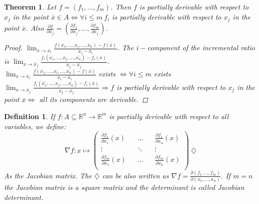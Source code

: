 \documentclass{article}
\newtheorem{theorem}{Theorem}
\newtheorem{definition}{Definition}
\begin{document}
            \begin{theorem}
                Let $f = (f_1,\dots,f_m)$. Then $f$ is partially derivable with respect to $x_j$ in the point $\overline{x} \in A \Longleftrightarrow \forall i \leq m \ f_i$ is partially derivable with respect to $x_j$ in the point $\overline{x}$. Also $\frac{\partial f}{\partial x_j} = \left( \frac{\partial f_1}{\partial x_j},\dots,\frac{\partial f_m}{\partial x_j}\right)$.
                \begin{proof}
                    $\lim_{x \to \overline{x_i}} \frac{f(\overline{x_1},\dots,x_i,\dots,\overline{x_n}) - f(\overline{x})}{x_i - \overline{x_i}}$. The $i-$component of the incremental ratio is $\lim_{x \to \overline{x_j}} \frac{f_i(\overline{x_1},\dots,x_j,\dots,\overline{x_n}) - f_i(\overline{x})}{x_j - \overline{x_j}}$. \\ 
                    $\lim_{x \to \overline{x_i}} \frac{f(\overline{x_1},\dots,x_i,\dots,\overline{x_n}) - f(\overline{x})}{x_i - \overline{x_i}}$ exists $\Longleftrightarrow \forall i \leq m$ exists $\lim_{x \to \overline{x_j}} \frac{f_i(\overline{x_1},\dots,x_j,\dots,\overline{x_n}) - f_i(\overline{x})}{x_j - \overline{x_j}} \Longrightarrow f$ is partially derivable with respect to $x_j$ in the point $\overline{x} \Longleftrightarrow$ all its components are derivable.
                \end{proof}
            \end{theorem}
            \begin{definition}
                If $f:A \subseteq \mathbb{R}^n \rightarrow \mathbb{R}^m$ is partially derivable with respect to all variables, we define:
                \begin{equation*}
                    \nabla f : x \longmapsto \left( \begin{matrix}
                        \frac{\partial f_1}{\partial x_1} (x) && \dots && \frac{\partial f_1}{\partial x_n}(x) \\
                        \vdots && \ddots  && \vdots \\
                        \frac{\partial f_m}{\partial x_1} (x) && \dots && \frac{\partial f_m}{\partial x_n}(x) \\
                    \end{matrix}\right) \ \diamondsuit
                \end{equation*}
                As the Jacobian matrix. The $\diamondsuit$ can be also written as $\nabla f = \frac{\partial \left(f_1, \dots, f_m\right) }{\partial \left(x_1,\dots, x_n\right)}$. If $m = n$ the Jacobian matrix is a square matrix and the determinant is called Jacobian determinant.
            \end{definition}
\end{document}
